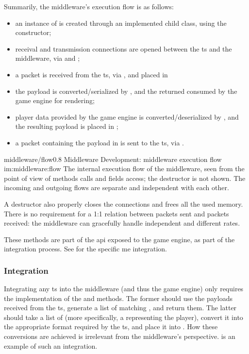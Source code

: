 Summarily, the \gls{middleware}'s execution flow is as follows:

\begin{itemize}
	\item an instance of  is created through an implemented child class, using the  constructor;
	\item receival and transmission connections are opened between the \gls{ts} and the \gls{middleware}, via  and ;
	\item a \gls{packet} is received from the \gls{ts}, via , and placed in 
	\item the \gls{payload} is converted/serialized by , and the returned  consumed by the game engine for rendering;
	\item player data provided by the game engine is converted/deserialized by , and the resulting \gls{payload} is placed in ;
	\item a \gls{packet} containing the \gls{payload} in  is sent to the \gls{ts}, via .
\end{itemize}

\begin{image}
	{middleware/flow}{0.8}
	{Middleware Development: \gls{middleware} execution flow}
	{im:middleware:flow}
	{}
	{The internal execution flow of the \gls{middleware}, seen from the point of view of methods calls and fields access; the destructor is not shown. The incoming and outgoing flows are separate and independent with each other.}
\end{image}

A destructor also properly closes the connections and frees all the used memory. There is no requirement for a 1:1 relation between \glspl{packet} sent and \glspl{packet} received: the \gls{middleware} can gracefully handle independent and different rates.

These methods are part of the \gls{api} exposed to the game engine, as part of the integration process. See  for the specific \gls{me} integration.

\subsubsection{Integration}

Integrating any \gls{ts} into the \gls{middleware} (and thus the game engine) only requires the implementation of the  and  methods. The former should use the \glspl{payload} received from the \gls{ts}, generate a list of matching , and return them. The latter should take a list of  (more specifically, a  representing the player), convert it into the appropriate format required by the \gls{ts}, and place it into . How these conversions are achieved is irrelevant from the \gls{middleware}'s perspective.  is an example of such an integration.

